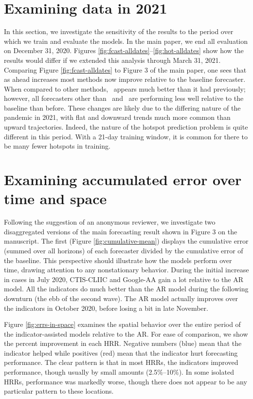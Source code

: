 \section{Examining data in 2021}

In this section, we investigate the sensitivity of the results to the
period over which we train and evaluate the models.  In the main
paper, we end all evaluation on December 31, 2020.  Figures
\ref{fig:fcast-alldates}--\ref{fig:hot-alldates} show how the
results would differ if we extended this analysis through March
  31, 2021. Comparing Figure \ref{fig:fcast-alldates} to Figure 3 of
the main paper, one sees that as ahead increases most methods now improve
relative to the baseline forecaster. When compared to other methods, 
\chngcli~appears much better than
it had previously; however, all forecasters other than \chngcov~and
\dv~are performing less well relative to the baseline than before.
These changes are likely due to the differing nature of the pandemic
in 2021, with flat and downward trends much more common than upward
trajectories.  Indeed, the nature of the hotspot prediction problem is
quite different in this period.  With a 21-day training window, it is
common for there to be many fewer hotspots in training.


\section{Examining accumulated error over time and space}

Following the suggestion of an anonymous reviewer, we investigate two
disaggregated versions of 
the main forecasting result shown in Figure 3 on the manuscript. The first
(Figure \ref{fig:cumulative-mean})
displays the cumulative error (summed over all horizons) of each forecaster
divided by the cumulative error 
of the baseline.
This perspective should illustrate how
the models perform over time, drawing attention to any nonstationary behavior.
During the initial increase in cases in July 2020, CTIS-CLIIC and Google-AA gain
a lot relative to the AR model. All the indicators do much better than the AR
model during the following downturn (the ebb of the second wave). The AR model
actually improves over the indicators in October 2020, before losing a bit in
late November.

Figure \ref{fig:errs-in-space} examines the spatial behavior over the entire
period of the indicator-assisted models relative to the AR. For ease of
comparison, we show the percent improvement in each HRR. Negative numbers (blue)
mean that the indicator helped while positives (red) mean that the indicator
hurt forecasting performance. The clear pattern is that in most HRRs, the
indicators improved performance, though usually by small amounts (2.5\%--10\%).
In some isolated HRRs, performance was markedly worse, though there does not
appear to be any particular pattern to these locations.

